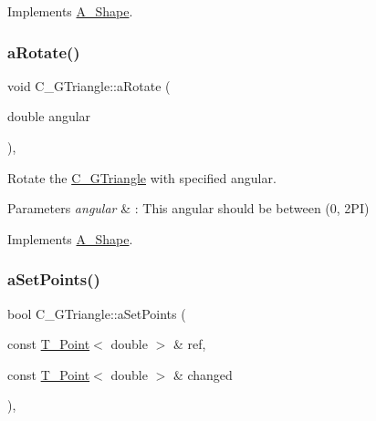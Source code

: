 Implements \hyperlink{classA__Shape_a892688cbbad3297e00e87cce0dbfc76d}{A\+\_\+\+Shape}.

\mbox{\label{classC__GTriangle_a29c641aea4ef5fa4224b42dffc5fefa5}} 
\subsubsection{\texorpdfstring{a\+Rotate()}{aRotate()}}
{\footnotesize\ttfamily void C\+\_\+\+G\+Triangle\+::a\+Rotate (\begin{DoxyParamCaption}\item[{double}]{angular }\end{DoxyParamCaption})\hspace{0.3cm}{\ttfamily [override]}, {\ttfamily [virtual]}}



Rotate the \hyperlink{classC__GTriangle}{C\+\_\+\+G\+Triangle} with specified angular. 


\begin{DoxyParams}{Parameters}
{\em angular} & \+: This angular should be between (0, 2\+PI) \\
\hline
\end{DoxyParams}


Implements \hyperlink{classA__Shape_a25b4e0c34cdb46da5382fe9c7467efaf}{A\+\_\+\+Shape}.

\mbox{\label{classC__GTriangle_a18c134ddf90bc4f5729064a47094068b}} 
\subsubsection{\texorpdfstring{a\+Set\+Points()}{aSetPoints()}}
{\footnotesize\ttfamily bool C\+\_\+\+G\+Triangle\+::a\+Set\+Points (\begin{DoxyParamCaption}\item[{const \hyperlink{classT__Point}{T\+\_\+\+Point}$<$ double $>$ \&}]{ref,  }\item[{const \hyperlink{classT__Point}{T\+\_\+\+Point}$<$ double $>$ \&}]{changed }\end{DoxyParamCaption})\hspace{0.3cm}{\ttfamily [override]}, {\ttfamily [virtual]}}



